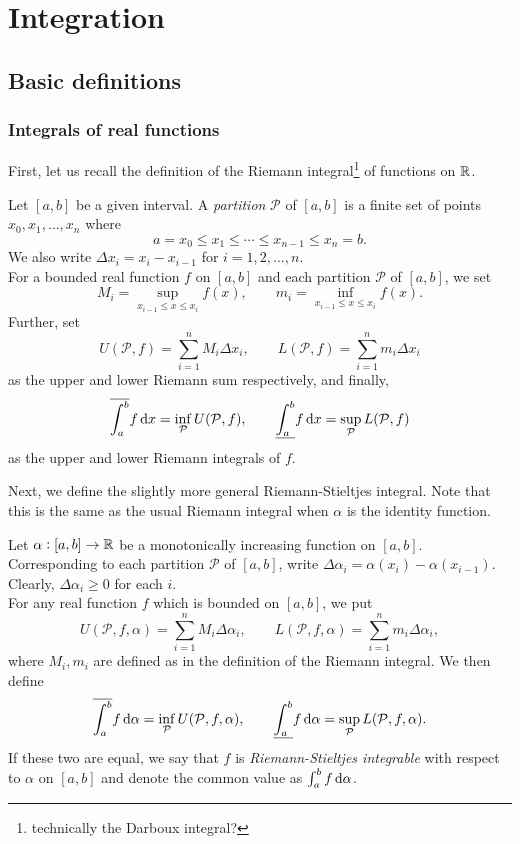 \section{Integration}

\subsection{Basic definitions}

	\subsubsection{Integrals of real functions}

		First, let us recall the definition of the Riemann integral\footnote{technically the Darboux integral?} of functions on $\mathbb{R}$.

		\begin{fdef}
			Let $[a,b]$ be a given interval. A \emph{partition} $\mathcal{P}$ of $[a,b]$ is a finite set of points $x_0,x_1,\ldots,x_n$ where
			\[ a = x_0 \le x_1 \le \cdots \le x_{n-1} \le x_n = b.  \]
			We also write $\Delta x_i = x_i - x_{i-1}$ for $i = 1,2,\ldots,n$.\\
			For a bounded real function $f$ on $[a,b]$ and each partition $\mathcal{P}$ of $[a,b]$, we set
			\[ M_i = \sup_{x_{i-1} \le x \le x_i} f(x), \qquad m_i = \inf_{x_{i-1} \le x \le x_i} f(x). \]
			Further, set
			\[ U(\mathcal{P},f) = \sum_{i=1}^{n} M_i \Delta x_i, \qquad L(\mathcal{P},f) = \sum_{i=1}^n m_i \Delta x_i \]
			as the upper and lower Riemann sum respectively,
			and finally,
			\[ \overline{\int_a^b} f \dif x = \inf_{\mathcal{P}} U(\mathcal{P},f), \qquad \underline{\int_a^b} f \dif x = \sup_{\mathcal{P}} L(\mathcal{P},f) \]
			as the upper and lower Riemann integrals of $f$.\\
		\end{fdef}

		Next, we define the slightly more general Riemann-Stieltjes integral. Note that this is the same as the usual Riemann integral when $\alpha$ is the identity function.

		\begin{fdef}
			Let $\alpha : [a,b] \to \mathbb{R}$ be a monotonically increasing function on $[a,b]$. Corresponding to each partition $\mathcal{P}$ of $[a,b]$, write $\Delta \alpha_i = \alpha(x_i) - \alpha(x_{i-1})$. Clearly, $\Delta \alpha_i \ge 0$ for each $i$.\\
			For any real function $f$ which is bounded on $[a,b]$, we put
			\[ U(\mathcal{P},f,\alpha) = \sum_{i=1}^n M_i \Delta \alpha_i, \qquad L(\mathcal{P},f,\alpha) = \sum_{i=1}^n m_i \Delta \alpha_i, \]
			where $M_i,m_i$ are defined as in the definition of the Riemann integral. We then define
			\[ \overline{\int_a^b} f \dif \alpha = \inf_{\mathcal{P}} U(\mathcal{P},f,\alpha), \qquad \underline{\int_a^b} f \dif \alpha = \sup_{\mathcal{P}} L(\mathcal{P},f,\alpha). \]
			If these two are equal, we say that $f$ is \emph{Riemann-Stieltjes integrable} with respect to $\alpha$ on $[a,b]$ and denote the common value as $\int_a^b f \dif \alpha$.
		\end{fdef}

